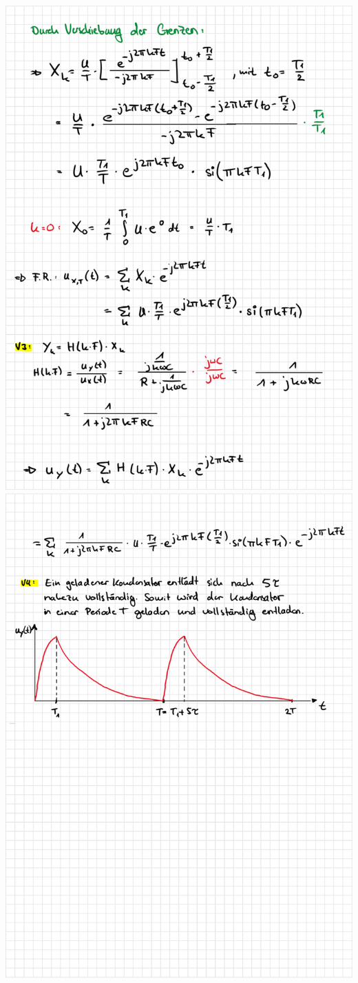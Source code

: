 \begin{center}
	\includegraphics[]{img/ssp1_vorb2.png}
	\newpage
	\thispagestyle{fancy}
	\includegraphics[]{img/ssp1_vorb3.png}
\end{center}
